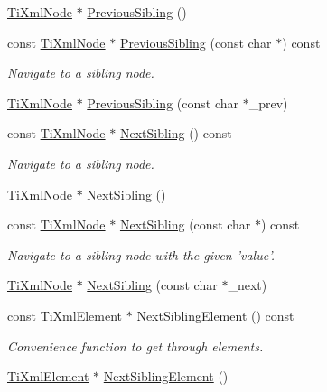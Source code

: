\begin{DoxyCompactItemize}
\hyperlink{classTiXmlNode}{TiXmlNode} $\ast$ \hyperlink{classTiXmlNode_af8c0642ad6ecc03f62953e68896ed1cc}{PreviousSibling} ()
\item 
const \hyperlink{classTiXmlNode}{TiXmlNode} $\ast$ \hyperlink{classTiXmlNode_abbb3b8c1f38fa7b9e52d584a4aeca795}{PreviousSibling} (const char $\ast$) const 
\begin{DoxyCompactList}\small\item\em Navigate to a sibling node. \item\end{DoxyCompactList}\item 
\hyperlink{classTiXmlNode}{TiXmlNode} $\ast$ \hyperlink{classTiXmlNode_a6c977049207177ef21b51972315c2053}{PreviousSibling} (const char $\ast$\_\-prev)
\item 
const \hyperlink{classTiXmlNode}{TiXmlNode} $\ast$ \hyperlink{classTiXmlNode_af854baeba384f5fe9859f5aee03b548e}{NextSibling} () const 
\begin{DoxyCompactList}\small\item\em Navigate to a sibling node. \item\end{DoxyCompactList}\item 
\hyperlink{classTiXmlNode}{TiXmlNode} $\ast$ \hyperlink{classTiXmlNode_a4d05f7b1d7b470ac6887edd072d4892a}{NextSibling} ()
\item 
const \hyperlink{classTiXmlNode}{TiXmlNode} $\ast$ \hyperlink{classTiXmlNode_acaf9dc17531ac041f602f9ad579573ea}{NextSibling} (const char $\ast$) const 
\begin{DoxyCompactList}\small\item\em Navigate to a sibling node with the given 'value'. \item\end{DoxyCompactList}\item 
\hyperlink{classTiXmlNode}{TiXmlNode} $\ast$ \hyperlink{classTiXmlNode_a4080bc5cc8a5c139e7cf308669e850fc}{NextSibling} (const char $\ast$\_\-next)
\item 
const \hyperlink{classTiXmlElement}{TiXmlElement} $\ast$ \hyperlink{classTiXmlNode_a7667217e269e0da01d1f82aee94d1a3d}{NextSiblingElement} () const 
\begin{DoxyCompactList}\small\item\em Convenience function to get through elements. \item\end{DoxyCompactList}\item 
\hyperlink{classTiXmlElement}{TiXmlElement} $\ast$ \hyperlink{classTiXmlNode_a1b211cb5034655a04358e0e2f6fc5010}{NextSiblingElement} ()

\end{DoxyCompactItemize}
